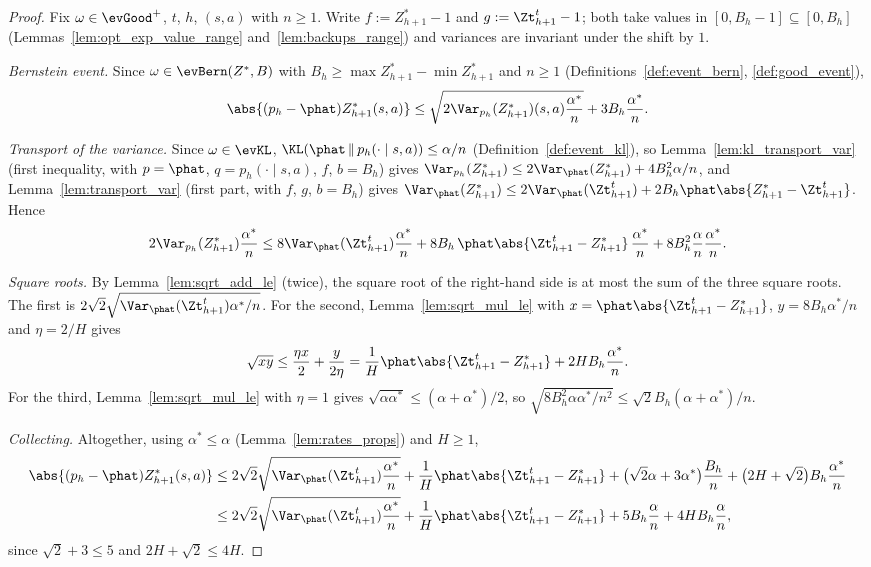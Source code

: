\begin{proof}
\leanok
Fix $\omega \in \evGood^+$, $t$, $h$, $(s,a)$ with $n \ge 1$. Write $f := Z^*_{h+1} - 1$ and
$g := \Zt^t_{h+1} - 1$; both take values in $[0, B_h - 1] \subseteq [0, B_h]$
(Lemmas~\ref{lem:opt_exp_value_range} and~\ref{lem:backups_range}) and variances are invariant
under the shift by $1$.

\emph{Bernstein event.} Since $\omega \in \evBern(Z^*, B)$ with $B_h \ge \max Z^*_{h+1} - \min Z^*_{h+1}$
and $n \ge 1$ (Definitions~\ref{def:event_bern}, \ref{def:good_event}),
\[
  \abs{(p_h - \phat) Z^*_{h+1}(s,a)}
  \le \sqrt{2 \Var_{p_h}(Z^*_{h+1})(s,a) \frac{\alpha^*}{n}} + 3 B_h \frac{\alpha^*}{n} .
\]

\emph{Transport of the variance.} Since $\omega \in \evKL$, $\KL(\phat \,\|\, p_h(\cdot \mid s,a)) \le \alpha/n$
(Definition~\ref{def:event_kl}), so Lemma~\ref{lem:kl_transport_var} (first inequality, with
$p = \phat$, $q = p_h(\cdot \mid s,a)$, $f$, $b = B_h$) gives
$\Var_{p_h}(Z^*_{h+1}) \le 2 \Var_{\phat}(Z^*_{h+1}) + 4 B_h^2 \alpha/n$, and
Lemma~\ref{lem:transport_var} (first part, with $f$, $g$, $b = B_h$) gives
$\Var_{\phat}(Z^*_{h+1}) \le 2\Var_{\phat}(\Zt^t_{h+1}) + 2 B_h \phat\abs{Z^*_{h+1} - \Zt^t_{h+1}}$.
Hence
\[
  2 \Var_{p_h}(Z^*_{h+1}) \frac{\alpha^*}{n}
  \le 8 \Var_{\phat}(\Zt^t_{h+1}) \frac{\alpha^*}{n}
  + 8 B_h \, \phat\abs{\Zt^t_{h+1} - Z^*_{h+1}} \, \frac{\alpha^*}{n}
  + 8 B_h^2 \frac{\alpha}{n}\frac{\alpha^*}{n} .
\]

\emph{Square roots.} By Lemma~\ref{lem:sqrt_add_le} (twice), the square root of the right-hand
side is at most the sum of the three square roots. The first is
$2\sqrt2\sqrt{\Var_{\phat}(\Zt^t_{h+1})\alpha^*/n}$. For the second, Lemma~\ref{lem:sqrt_mul_le}
with $x = \phat\abs{\Zt^t_{h+1} - Z^*_{h+1}}$, $y = 8 B_h \alpha^*/n$ and $\eta = 2/H$ gives
\[
  \sqrt{x y} \le \frac{\eta x}{2} + \frac{y}{2\eta}
  = \frac1H \phat\abs{\Zt^t_{h+1} - Z^*_{h+1}} + 2 H B_h \frac{\alpha^*}{n} .
\]
For the third, Lemma~\ref{lem:sqrt_mul_le} with $\eta = 1$ gives
$\sqrt{\alpha \alpha^*} \le (\alpha + \alpha^*)/2$, so
$\sqrt{8 B_h^2 \alpha\alpha^*/n^2} \le \sqrt2 B_h (\alpha + \alpha^*)/n$.

\emph{Collecting.} Altogether, using $\alpha^* \le \alpha$ (Lemma~\ref{lem:rates_props}) and
$H \ge 1$,
\begin{align*}
  \abs{(p_h - \phat) Z^*_{h+1}(s,a)}
  &\le 2\sqrt2\sqrt{\Var_{\phat}(\Zt^t_{h+1})\frac{\alpha^*}{n}}
     + \frac1H \phat\abs{\Zt^t_{h+1} - Z^*_{h+1}}
     + \big(\sqrt2 \alpha + 3 \alpha^*\big)\frac{B_h}{n}
     + \big(2H + \sqrt2\big) B_h \frac{\alpha^*}{n} \\
  &\le 2\sqrt2\sqrt{\Var_{\phat}(\Zt^t_{h+1})\frac{\alpha^*}{n}}
     + \frac1H \phat\abs{\Zt^t_{h+1} - Z^*_{h+1}}
     + 5 B_h \frac{\alpha}{n} + 4 H B_h \frac{\alpha}{n},
\end{align*}
since $\sqrt2 + 3 \le 5$ and $2H + \sqrt2 \le 4H$.
\end{proof}

